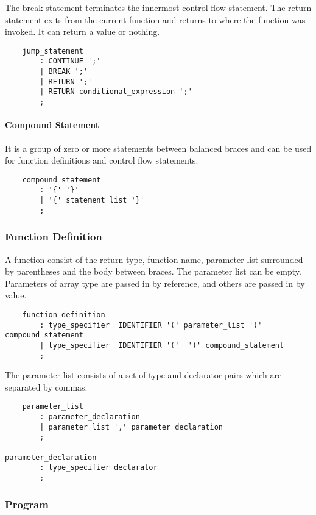 The break statement terminates the innermost control flow statement.  The return statement exits
from the current function and returns to where the function was invoked. It can return a value or
nothing.

\begin{verbatim}
    jump_statement
        : CONTINUE ';'
        | BREAK ';'
        | RETURN ';'
        | RETURN conditional_expression ';'
        ;
\end{verbatim}

\paragraph{Compound Statement}

It is a group of zero or more statements between balanced braces and can be used for function
definitions and control flow statements.

\begin{verbatim}
    compound_statement
        : '{' '}'
        | '{' statement_list '}'
        ;
\end{verbatim}

\subsubsection{Function Definition}

A function consist of the return type, function name, parameter list surrounded by parentheses and
the body between braces. The parameter list can be empty. Parameters of array type are passed in by
reference, and others are passed in by value.

\begin{verbatim}
    function_definition
        : type_specifier  IDENTIFIER '(' parameter_list ')' compound_statement
        | type_specifier  IDENTIFIER '('  ')' compound_statement
        ;
\end{verbatim}

The parameter list consists of a set of type and declarator pairs which are separated by commas.

\begin{verbatim}
    parameter_list
        : parameter_declaration
        | parameter_list ',' parameter_declaration
        ;

parameter_declaration
        : type_specifier declarator
        ;
\end{verbatim}

\subsubsection{Program}

